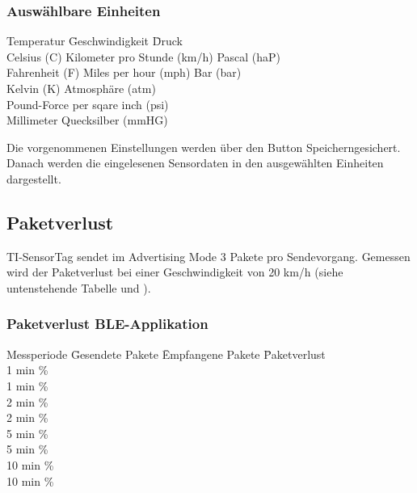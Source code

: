 \subsubsection*{Auswählbare Einheiten}
\begin{tabbing}
    Temperatur     \quad\= Geschwindigkeit            \quad\= Druck \\[0.8ex]
    Celsius (C)    \> Kilometer pro Stunde (km/h)\> Pascal (haP)\\
    Fahrenheit (F) \> Miles per hour (mph)       \> Bar (bar)\\
    Kelvin (K)     \>                            \> Atmosph\"{a}re (atm)\\
                   \>                      \> Pound-Force per sqare inch (psi)\\
                   \>                      \> Millimeter Quecksilber (mmHG)\\
\end{tabbing} 

  
Die vorgenommenen Einstellungen werden über den Button \glqq Speichern\grqq gesichert. Danach werden die eingelesenen Sensordaten in den ausgewählten Einheiten dargestellt.

\subsection{Paketverlust}

TI-SensorTag sendet im Advertising Mode 3 Pakete pro Sendevorgang. Gemessen wird der Paketverlust bei einer Geschwindigkeit von 20 km/h (siehe untenstehende Tabelle und ).   

\subsubsection*{Paketverlust BLE-Applikation}
\begin{tabbing}
    Messperiode \quad\= Gesendete Pakete \quad\= Empfangene Pakete \quad\= Paketverlust\\[0.8ex]
    1 min      \thinspace\%  \\
    1 min      \thinspace\%  \\
    2 min      \thinspace\%  \\
    2 min      \thinspace\%  \\
    5 min      \thinspace\%  \\
    5 min      \thinspace\%  \\
    10 min      \thinspace\%  \\
    10 min      \thinspace\%  \\
\end{tabbing} 

